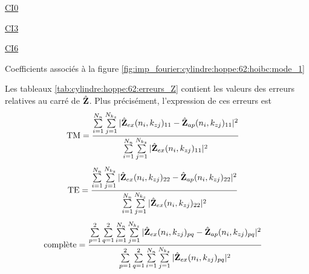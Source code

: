   \begin{table}[!hbt]
    \centering
    \begin{minipage}[t]{0.49\textwidth}
      \vspace{0pt}
      \centering
      \begin{coefftable}{\hyperlink{ci0}{CI0}}
        
      \end{coefftable}
      \begin{coefftable}{\hyperlink{ci3}{CI3}}
        
      \end{coefftable}
    \end{minipage}
    \begin{minipage}[t]{0.49\textwidth}
      \vspace{0pt}
      \centering
      \begin{coefftable}{\hyperlink{ci6}{CI6}}
        
      \end{coefftable}
    \end{minipage}
    \caption{Coefficients associés à la figure \ref{fig:imp_fourier:cylindre:hoppe:62:hoibc:mode_1}}
    \label{tab:imp_fourier:cylindre:hoppe:62:hoibc:mode_1}
  \end{table}

  Les tableaux \ref{tab:cylindre:hoppe:62:erreurs_Z} contient les valeurs des erreurs relatives au carré de \(\hat{\mathbf{Z}}\). 
  Plus précisément, l'expression de ces erreurs est 
  \begin{align*}
    \text{TM} &= \dfrac{\sum\limits_{i=1}^{N_n}\sum\limits_{j=1}^{N_{k_z}}|\hat{\mathbf{Z}}_{ex}(n_i,k_{zj})_{11}-\hat{\mathbf{Z}}_{ap}(n_i,k_{zj})_{11}|^2}{\sum\limits_{i=1}^{N_n}\sum\limits_{j=1}^{N_{k_z}}|\hat{\mathbf{Z}}_{ex}(n_i,k_{zj})_{11}|^2}
  \end{align*}
  \begin{align*}
    \text{TE} &= \dfrac{\sum\limits_{i=1}^{N_n}\sum\limits_{j=1}^{N_{k_z}}|\hat{\mathbf{Z}}_{ex}(n_i,k_{zj})_{22}-\hat{\mathbf{Z}}_{ap}(n_i,k_{zj})_{22}|^2}{\sum\limits_{i=1}^{N_n}\sum\limits_{j=1}^{N_{k_z}}|\hat{\mathbf{Z}}_{ex}(n_i,k_{zj})_{22}|^2}
  \end{align*}
  \begin{align*}
    \text{complète}  &= \dfrac{\sum\limits_{p=1}^2\sum\limits_{q=1}^2\sum\limits_{i=1}^{N_n}\sum\limits_{j=1}^{N_{k_z}}|\hat{\mathbf{Z}}_{ex}(n_i,k_{zj})_{pq}-\hat{\mathbf{Z}}_{ap}(n_i,k_{zj})_{pq}|^2}{\sum\limits_{p=1}^2\sum\limits_{q=1}^2\sum\limits_{i=1}^{N_n}\sum\limits_{j=1}^{N_{k_z}}|\hat{\mathbf{Z}}_{ex}(n_i,k_{zj})_{pq}|^2}
  \end{align*}

